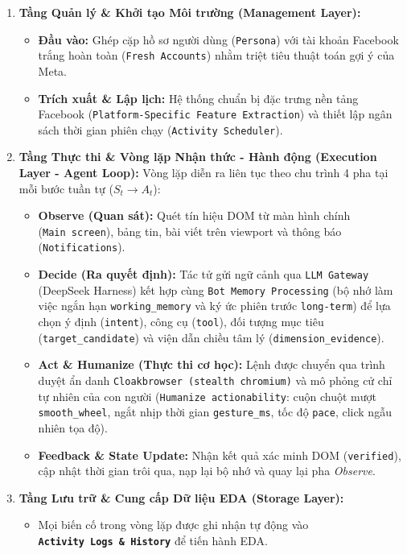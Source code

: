 \documentclass[11pt]{article}
\providecommand{\tightlist}{%
      \setlength{\itemsep}{0pt}\setlength{\parskip}{0pt}}
\begin{document}
\begin{enumerate}
\def\labelenumi{\arabic{enumi}.}
\tightlist
\item
  \textbf{Tầng Quản lý \& Khởi tạo Môi trường (Management Layer):}

  \begin{itemize}
  \tightlist
  \item
    \textbf{Đầu vào:} Ghép cặp hồ sơ người dùng (\texttt{Persona}) với
    tài khoản Facebook trắng hoàn toàn (\texttt{Fresh\ Accounts}) nhằm
    triệt tiêu thuật toán gợi ý của Meta.
  \item
    \textbf{Trích xuất \& Lập lịch:} Hệ thống chuẩn bị đặc trưng nền
    tảng Facebook (\texttt{Platform-Specific\ Feature\ Extraction}) và
    thiết lập ngân sách thời gian phiên chạy
    (\texttt{Activity\ Scheduler}).
  \end{itemize}
\item
  \textbf{Tầng Thực thi \& Vòng lặp Nhận thức - Hành động (Execution
  Layer - Agent Loop):} Vòng lặp diễn ra liên tục theo chu trình 4 pha
  tại mỗi bước tuần tự (\(S_t \rightarrow A_t\)):

  \begin{itemize}
  \tightlist
  \item
    \textbf{Observe (Quan sát):} Quét tín hiệu DOM từ màn hình chính
    (\texttt{Main\ screen}), bảng tin, bài viết trên viewport và thông
    báo (\texttt{Notifications}).
  \item
    \textbf{Decide (Ra quyết định):} Tác tử gửi ngữ cảnh qua
    \texttt{LLM\ Gateway} (DeepSeek Harness) kết hợp cùng
    \texttt{Bot\ Memory\ Processing} (bộ nhớ làm việc ngắn hạn
    \texttt{working\_memory} và ký ức phiên trước \texttt{long-term}) để
    lựa chọn ý định (\texttt{intent}), công cụ (\texttt{tool}), đối
    tượng mục tiêu (\texttt{target\_candidate}) và viện dẫn chiều tâm lý
    (\texttt{dimension\_evidence}).
  \item
    \textbf{Act \& Humanize (Thực thi cơ học):} Lệnh được chuyển qua
    trình duyệt ẩn danh \texttt{Cloakbrowser\ (stealth\ chromium)} và mô
    phỏng cử chỉ tự nhiên của con người
    (\texttt{Humanize\ actionability}: cuộn chuột mượt
    \texttt{smooth\_wheel}, ngắt nhịp thời gian \texttt{gesture\_ms},
    tốc độ \texttt{pace}, click ngẫu nhiên tọa độ).
  \item
    \textbf{Feedback \& State Update:} Nhận kết quả xác minh DOM
    (\texttt{verified}), cập nhật thời gian trôi qua, nạp lại bộ nhớ và
    quay lại pha \emph{Observe}.
  \end{itemize}
\item
  \textbf{Tầng Lưu trữ \& Cung cấp Dữ liệu EDA (Storage Layer):}

  \begin{itemize}
  \tightlist
  \item
    Mọi biến cố trong vòng lặp được ghi nhận tự động vào
    \textbf{\texttt{Activity\ Logs\ \&\ History}} để tiến hành EDA.
  \end{itemize}
\end{enumerate}
\end{document}
